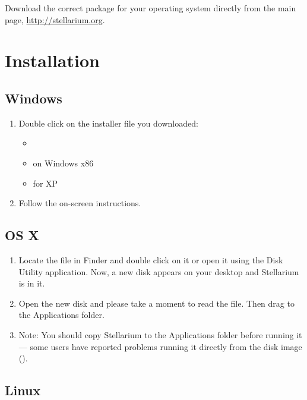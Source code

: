 Download the correct package for your operating system directly from the main page,
\href{http://stellarium.org}{http://stellarium.org}.

\section{Installation}
\label{sec:GettingStarted:Installation}

\subsection{Windows}

\begin{enumerate}
\item Double click on the installer file you downloaded:
\begin{itemize}
\item {}
\item {} on Windows x86
\item {} for XP
\end{itemize}
\item Follow the on-screen instructions.
\end{enumerate}

\subsection{OS X}

\begin{enumerate}
\item
  Locate the  file in
  Finder and double click on it or open it using the Disk Utility
  application. Now, a new disk appears on your desktop and Stellarium is
  in it.
\item
  Open the new disk and please take a moment to read the  file.
  Then drag  to the Applications folder.
\item
  Note: You should copy Stellarium to the Applications folder before
  running it --- some users have reported problems running it directly
  from the disk image ().
\end{enumerate}

\subsection{Linux}


